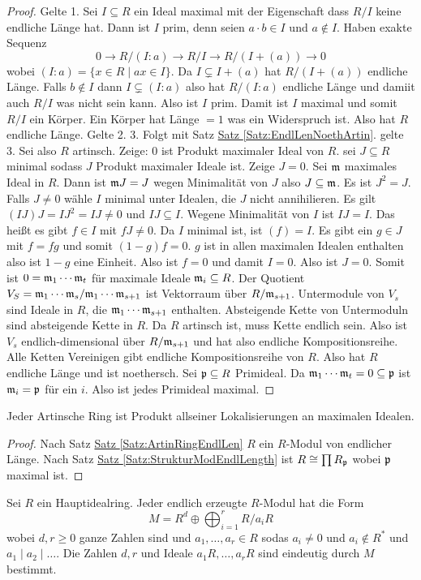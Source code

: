 \begin{proof}
    Gelte 1. Sei $I\subseteq R$ ein Ideal maximal mit der Eigenschaft dass $R/I$ keine endliche Länge hat. Dann ist $I$ prim, denn seien $a\cdot b\in I$ und $a\not\in I$. Haben exakte Sequenz
    $$0\to R/(I:a)\to R/I\to R/(I+(a))\to 0$$ wobei $(I:a)=\{x\in R\mid ax\in I\}$. Da $I\subsetneq I+(a)$ hat $R/(I+(a))$ endliche Länge. Falls $b\not\in I$ dann $I\subsetneq (I:a)$ also hat $R/(I:a)$ endliche Länge und damiit auch $R/I$ was nicht sein kann. Also ist $I$ prim. Damit ist $I$ maximal und somit $R/I$ ein Körper. Ein Körper hat Länge $=1$ was ein Widerspruch ist.
    Also hat $R$ endliche Länge.
    Gelte 2. 3. Folgt mit Satz \hyperref[Satz:EndlLenNoethArtin]{Satz \ref{Satz:EndlLenNoethArtin}}. gelte 3. Sei also $R$ artinsch. Zeige: $0$ ist Produkt maximaler Ideal von $R$.
    sei $J\subseteq R$ minimal sodass $J$ Produkt maximaler Ideale ist. Zeige $J=0$.
    Sei $\mathfrak{m} $ maximales Ideal in $R$. Dann ist $\mathfrak{m} J=J$ wegen Minimalität von $J$ also $J\subseteq \mathfrak{m}$. Es ist $J^2=J$.
    Falls $J\neq 0$ wähle $I$ minimal unter Idealen, die $J$ nicht annihilieren.
    Es gilt $(IJ)J=IJ^2=IJ\neq 0$ und $IJ\subseteq I$. Wegene Minimalität von $I$ ist $IJ=I$. Das heißt es gibt $f\in I$ mit $fJ\neq 0$. Da $I$ minimal ist, ist $(f)=I$. Es gibt ein $g\in J$ mit $f=fg$ und somit $(1-g)f=0$.
    $g$ ist in allen maximalen Idealen enthalten also ist $1-g$ eine Einheit. Also ist $f=0$ und damit $I=0$. Also ist $J=0$.
    Somit ist $0=\mathfrak{m}_1\cdots \mathfrak{m}_t$ für maximale Ideale $\mathfrak{m}_i\subseteq R$.
    Der Quotient $V_S=\mathfrak{m}_1\cdots \mathfrak{m}_s/\mathfrak{m}_1\cdots \mathfrak{m}_{s+1}$ ist Vektorraum über $R/\mathfrak{m}_{s+1}$. Untermodule von $V_s$ sind Ideale in $R$, die $\mathfrak{m}_1\cdots \mathfrak{m}_{s+1}$ enthalten.
    Absteigende Kette von Untermoduln sind absteigende Kette in $R$. Da $R$ artinsch ist, muss Kette endlich sein.
    Also ist $V_s$ endlich-dimensional über $R/\mathfrak{m}_{s+1}$ und hat also endliche Kompositionsreihe. Alle Ketten Vereinigen gibt endliche Kompositionsreihe von $R$. Also hat $R$ endliche Länge und ist noethersch. Sei $\mathfrak{p}\subseteq R$ Primideal. Da $\mathfrak{m}_1\cdots \mathfrak{m}_t=0\subseteq \mathfrak{p}$ ist $\mathfrak{m}_i=\mathfrak{p}$ für ein $i$. Also ist jedes Primideal maximal.
\end{proof}
\begin{Kor}
    Jeder Artinsche Ring ist Produkt allseiner Lokalisierungen an maximalen Idealen.
\end{Kor}
\begin{proof}
    Nach Satz \hyperref[Satz:ArtinRingEndlLen]{Satz \ref{Satz:ArtinRingEndlLen}} $R$ ein $R$-Modul von endlicher Länge. Nach Satz \hyperref[Satz:StrukturModEndlLength]{Satz \ref{Satz:StrukturModEndlLength}} ist $R\cong \prod R_{\mathfrak{p}}$ wobei $\mathfrak{p}$ maximal ist.
\end{proof}
\begin{Satz}
    Sei $R$ ein Hauptidealring. Jeder endlich erzeugte $R$-Modul hat die Form
    $$M=R^d\oplus\bigoplus_{i=1}^rR/a_iR$$ wobei $d,r\geq 0$ ganze Zahlen sind und $a_1,\dots,a_r\in R$ sodas $a_i\neq 0$ und $a_i\not\in R^*$ und $a_1\mid a_2\mid \dots$. Die Zahlen $d,r$ und Ideale $a_1R,\dots,a_rR$ sind eindeutig durch $M$ bestimmt.
\end{Satz}

